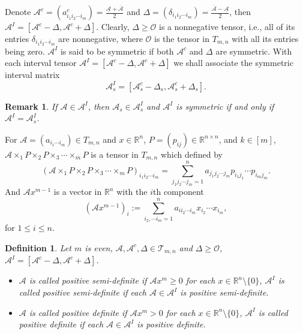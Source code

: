 \documentclass[twoside]{article}
\newtheorem{definition}{Definition}[section]
\newtheorem{remark}{Remark}[section]
\begin{document}
Denote $\mathcal{A}^c=(a^c_{i_1i_2\cdots i_m})=\frac{\underline{\mathcal{A}}+\overline{\mathcal{A}}}{2}$ and $\Delta=(\delta_{i_1i_2\cdots i_m})=\frac{\overline{\mathcal{A}}-\underline{\mathcal{A}}}{2}$, then $\mathcal{A}^I=[\mathcal{A}^c- \Delta, \mathcal{A}^c+ \Delta]$. Clearly, $\Delta\geq\mathcal{O}$ is a nonnegative tensor, i.e., all of its entries $\delta_{i_1i_2\cdots i_m}$ are nonnegative, where $\mathcal{O}$ is the tensor in $T_{m,n}$ with all its entries being zero. $\mathcal{A}^I$ is said to be symmetric if both $\mathcal{A}^c$ and $\Delta$ are symmetric. With each interval tensor $\mathcal{A}^I=[\mathcal{A}^c- \Delta, \mathcal{A}^c+ \Delta]$ we shall associate the symmetric interval matrix
$$\mathcal{A}^I_s=[\mathcal{A}_s^c- \Delta_s, \mathcal{A}_s^c+ \Delta_s].$$

\begin{remark}
If $\mathcal{A}\in \mathcal{A}^I$, then $\mathcal{A}_s\in \mathcal{A}^I_s$ and $\mathcal{A}^I$ is symmetric if and only if
$\mathcal{A}^I=\mathcal{A}^I_s$.
\end{remark}
For $\mathcal{A}= (a_{i_1\cdots i_m})\in T_{m,n}$ and $x\in\mathbb{R}^n$, $P=(p_{ij})\in\mathbb{R}^{n\times n}$, and $k\in[m]$, $\mathcal{A}\times_1 P\times_2P\times_3\cdots\times_m P$ is a tensor in $T_{m,n}$ which defined by
$$(\mathcal{A}\times_1 P\times_2P\times_3\cdots\times_m P)_{i_1i_2\cdots i_m}=\sum\limits_{j_1j_2\cdots j_m=1}^n a_{j_1j_2\cdots j_m}p_{i_1j_1}\cdots p_{i_mj_m}.$$
And $\mathcal{A}x^{m-1}$ is a vector in $\mathbb{R}^n$ with the $i$th component
$$(\mathcal{A}x^{m-1})_i:=\sum\limits_{i_2,\cdots i_m=1}^n a_{ii_2\cdots i_m}x_{i_2}\cdots x_{i_m},$$
for $1\leq i \leq n$.


\begin{definition}\label{def1}\textup{\cite{qi2005,sr2020,boz2020}}
Let $m$ is even, ${\mathcal{A}},{\mathcal{A}^c,\Delta}\in{\mathcal{T}}_{m,n}$ and $\Delta\geq \mathcal{O}$, ${\mathcal{A}}^I=[\mathcal{A}^c- \Delta, \mathcal{A}^c+ \Delta]$.
\begin{itemize}
\item[(a)] $\mathcal{A}$ is called positive semi-definite if $\mathcal{A}x^m\geq0$ for each $x\in{\mathbb{R}}^n\setminus\{0\}$, $\mathcal{A}^I$ is called positive semi-definite if each $\mathcal{A}\in\mathcal{A}^I$ is positive semi-definite.
\item[(b)] $\mathcal{A}$ is called positive definite if $\mathcal{A}x^m>0$ for each $x\in{\mathbb{R}}^n\setminus\{0\}$, $\mathcal{A}^I$ is called positive definite if each $\mathcal{A}\in\mathcal{A}^I$ is positive definite.
\end{itemize}
\end{definition}
\end{document}
